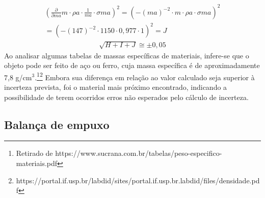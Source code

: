 \begin{align*}
    \left( \frac{\partial }{\partial ma}m\cdot\rho a \cdot \frac{1}{ma} \cdot \sigma ma \right)^2  = \left(-(ma)^{-2} \cdot m\cdot\rho a \cdot \sigma ma \right)^2 \\ = \left(- (147)^{-2} \cdot 1150 \cdot 0,977 \cdot 1 \right)^2 = J
\end{align*}
\begin{align*}
    \sqrt{H + I + J} \cong \pm 0,05
\end{align*}
Ao analisar algumas tabelas de massas específicas de materiais, infere-se que o objeto pode ser feito de aço ou ferro, cuja massa específica é de aproximadamente 7,8 g/cm\(^3\).\footnote{Retirado de https://www.sucrana.com.br/tabelas/peso-especifico-materiais.pdf}\footnote{https://portal.if.usp.br/labdid/sites/portal.if.usp.br.labdid/files/densidade.pdf}
Embora sua diferença em relação ao valor calculado seja superior à incerteza prevista, foi o material mais próximo encontrado, indicando a possibilidade de terem ocorridos erros não esperados pelo cálculo de incerteza.


\subsection{Balança de empuxo}

